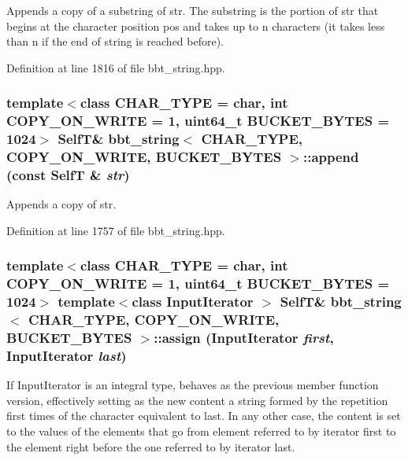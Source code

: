 Appends a copy of a substring of str. The substring is the portion of str that begins at the character position pos and takes up to n characters (it takes less than n if the end of string is reached before). 

Definition at line 1816 of file bbt\_\-string.hpp.\hypertarget{classbbt__string_b180cabdee6b7d393fc4e32230445051}{
\subsubsection[{append}]{\setlength{\rightskip}{0pt plus 5cm}template$<$class CHAR\_\-TYPE  = char, int COPY\_\-ON\_\-WRITE = 1, uint64\_\-t BUCKET\_\-BYTES = 1024$>$ {\bf SelfT}\& {\bf bbt\_\-string}$<$ CHAR\_\-TYPE, COPY\_\-ON\_\-WRITE, BUCKET\_\-BYTES $>$::append (const {\bf SelfT} \& {\em str})}}
\label{classbbt__string_b180cabdee6b7d393fc4e32230445051}


Appends a copy of str. 

Definition at line 1757 of file bbt\_\-string.hpp.\hypertarget{classbbt__string_fa0f90cc47b7fb7c8d4bf8a5aab3658d}{
\subsubsection[{assign}]{\setlength{\rightskip}{0pt plus 5cm}template$<$class CHAR\_\-TYPE  = char, int COPY\_\-ON\_\-WRITE = 1, uint64\_\-t BUCKET\_\-BYTES = 1024$>$ template$<$class InputIterator $>$ {\bf SelfT}\& {\bf bbt\_\-string}$<$ CHAR\_\-TYPE, COPY\_\-ON\_\-WRITE, BUCKET\_\-BYTES $>$::assign (InputIterator {\em first}, \/  InputIterator {\em last})}}
\label{classbbt__string_fa0f90cc47b7fb7c8d4bf8a5aab3658d}


If InputIterator is an integral type, behaves as the previous member function version, effectively setting as the new content a string formed by the repetition first times of the character equivalent to last. In any other case, the content is set to the values of the elements that go from element referred to by iterator first to the element right before the one referred to by iterator last. 

